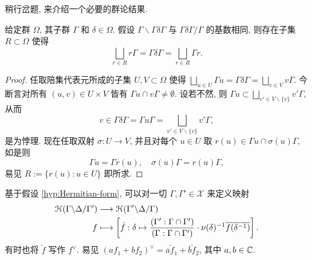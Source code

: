 稍行岔题, 来介绍一个必要的群论结果.
\begin{lemma}\label{prop:same-representatives}
	给定群 $\Omega$, 其子群 $\Gamma$ 和 $\delta \in \Omega$. 假设 $\Gamma \backslash \Gamma\delta\Gamma$ 与 $\Gamma\delta\Gamma/\Gamma$ 的基数相同, 则存在子集 $R \subset \Omega$ 使得
	\[ \bigsqcup_{r \in R} r\Gamma = \Gamma\delta\Gamma = \bigsqcup_{r \in R} \Gamma r. \]
\end{lemma}
\begin{proof}
	任取陪集代表元所成的子集 $U, V \subset \Omega$ 使得 $\bigsqcup_{u \in U} \Gamma u = \Gamma\delta\Gamma = \bigsqcup_{v \in V} v\Gamma$. 今断言对所有 $(u,v) \in U \times V$ 皆有 $\Gamma u \cap v \Gamma \neq \emptyset$. 设若不然, 则 $\Gamma u \subset \bigsqcup_{v' \in V \smallsetminus \{v\}} v' \Gamma$, 从而
	\[ v \in \Gamma\delta\Gamma = \Gamma u \Gamma = \bigsqcup_{v' \in V \smallsetminus \{v\}} v'\Gamma, \]
	是为悖理. 现在任取双射 $\sigma: U \to V$, 并且对每个 $u \in U$ 取 $r(u) \in \Gamma u \cap \sigma(u)\Gamma$, 如是则
	\[ \Gamma u = \Gamma r(u), \quad \sigma(u)\Gamma = r(u)\Gamma, \]
	易见 $R := \{r(u) : u \in U \}$ 即所求.
\end{proof}

基于假设 \ref{hyp:Hermitian-form}, 可以对一切 $\Gamma, \Gamma' \in \mathcal{X}$ 来定义映射
\begin{equation}\label{eqn:Hecke-transpose}\begin{aligned}
	\EuScript{H}(\Gamma \backslash \Delta / \Gamma') & \longrightarrow \EuScript{H}(\Gamma' \backslash \Delta /\Gamma) \\
	f & \longmapsto \left[ \check{f}: \delta \mapsto \dfrac{(\Gamma': \Gamma \cap \Gamma')}{(\Gamma: \Gamma \cap \Gamma')} \cdot \nu(\delta)^{-1} \overline{f(\delta^{-1})} \right].
\end{aligned}\end{equation}
有时也将 $\check{f}$ 写作 $f^\vee$. 易见 $(af_1 + bf_2)^\vee = \overline{a}\check{f}_1 + \overline{b}\check{f}_2$, 其中 $a,b \in \mathbb{C}$.

